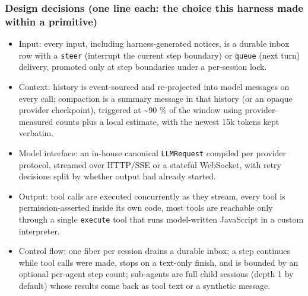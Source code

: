 \subsubsection*{Design decisions (one line each: the choice this harness made within a primitive)}
\begin{itemize}
\item Input: every input, including harness-generated notices, is a durable inbox row with a \texttt{steer} (interrupt the current step boundary) or \texttt{queue} (next turn) delivery, promoted only at step boundaries under a per-session lock.
\item Context: history is event-sourced and re-projected into model messages on every call; compaction is a summary message in that history (or an opaque provider checkpoint), triggered at \textasciitilde{}90 \% of the window using provider-measured counts plus a local estimate, with the newest 15k tokens kept verbatim.
\item Model interface: an in-house canonical \texttt{LLMRequest} compiled per provider protocol, streamed over HTTP/SSE or a stateful WebSocket, with retry decisions split by whether output had already started.
\item Output: tool calls are executed concurrently as they stream, every tool is permission-asserted inside its own code, most tools are reachable only through a single \texttt{execute} tool that runs model-written JavaScript in a custom interpreter.
\item Control flow: one fiber per session drains a durable inbox; a step continues while tool calls were made, stops on a text-only finish, and is bounded by an optional per-agent step count; sub-agents are full child sessions (depth 1 by default) whose results come back as tool text or a synthetic message.
\end{itemize}

